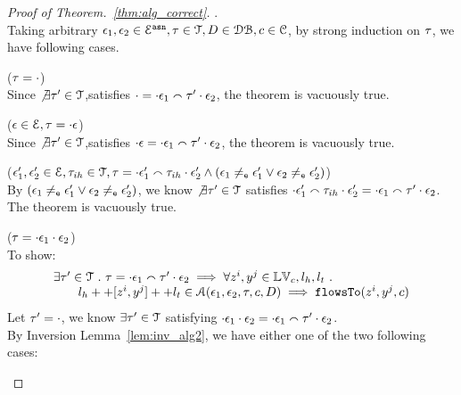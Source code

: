 \begin{proof}[Proof of Theorem.~\ref{thm:alg_correct}].
\\
Taking arbitrary $\mathtt{\epsilon}_1, \mathtt{\epsilon}_2 \in \mathcal{E}^{\mathtt{{asn}}}, \mathtt{\tau} \in \mathcal{T}, D \in \mathcal{DB} , c \in \mathcal{C}$,
by strong induction on $\mathtt{\tau}$, we have following cases.
\begin{case}($\mathtt{\tau} = \cdot$)
\\
Since $\not\exists \mathtt{\tau}' \in \mathcal{T}$,satisfies $
\cdot  = \cdot {} \mathtt{\epsilon}_1 \smallfrown \mathtt{\tau}' \cdot \mathtt{\epsilon}_2$, the theorem is vacuously true.
\end{case}
%
\begin{case}($\mathtt{\epsilon} \in \mathcal{E}, \mathtt{\tau} = \cdot \mathtt{\epsilon}$)
\\
Since $\not\exists \mathtt{\tau}' \in \mathcal{T}$,satisfies $
\cdot  \mathtt{\epsilon} = \cdot \mathtt{\epsilon}_1 \smallfrown \mathtt{\tau}' \cdot \mathtt{\epsilon}_2$, the theorem is vacuously true.
\end{case}
%
\begin{case}($\mathtt{\epsilon}_1', \mathtt{\epsilon}_2' \in \mathcal{E}, \mathtt{\tau}_{ih} \in \mathcal{T}, 
\mathtt{\tau} = \cdot \mathtt{\epsilon}_1' \smallfrown \mathtt{\tau}_{ih} \cdot \mathtt{\epsilon}_2' \land 
(\mathtt{\epsilon}_1 \neq_{\mathtt{e}} \mathtt{\epsilon}_1' \lor \mathtt{\epsilon}_2 \neq_{\mathtt{e}} \mathtt{\epsilon}_2')$)
\\
By $(\mathtt{\epsilon}_1 \neq_{\mathtt{e}} \mathtt{\epsilon}_1' \lor \mathtt{\epsilon}_2 \neq_{\mathtt{e}} \mathtt{\epsilon}_2')$,
we know $\not\exists \mathtt{\tau}' \in \mathcal{T}$ satisfies $
\cdot \mathtt{\epsilon}_1' \smallfrown \mathtt{\tau}_{ih} \cdot \mathtt{\epsilon}_2' = \cdot \mathtt{\epsilon}_1 \smallfrown \mathtt{\tau}' \cdot \mathtt{\epsilon}_2$.
\\
The theorem is vacuously true.
\end{case}
%
%
\begin{case}
\label{case:alg_correct_base}
($\mathtt{\tau} = \cdot {} \mathtt{\epsilon}_1 \cdot {} \mathtt{\epsilon}_2$)
\\
To show:
\[
\begin{array}{l}
  \exists \mathtt{\tau}' \in \mathcal{T} ~.~ \mathtt{\tau} = \cdot \mathtt{\epsilon}_1 \smallfrown \mathtt{\tau}' \cdot \mathtt{\epsilon}_2
  \implies    
  \forall  z^i, y^j \in \mathbb{LV}_c, l_h, l_t ~.~ 
    \\ \qquad 
    l_h ++ [z^i, y^j] ++ l_t \in \mathcal{A}(\mathtt{\epsilon}_1, \mathtt{\epsilon}_2, \mathtt{\tau}, c, D)
   \implies \mathtt{flowsTo}(z^i, y^j, c)
\end{array}
\]
%
Let $\mathtt{\tau}' = \cdot$, we know $\exists \mathtt{\tau}' \in \mathcal{T}$ satisfying 
$\cdot {} \mathtt{\epsilon}_1  {} \cdot {} \mathtt{\epsilon}_2 = \cdot {} \mathtt{\epsilon}_1 \smallfrown \mathtt{\tau}' \cdot \mathtt{\epsilon}_2$.
\\
By Inversion Lemma~\ref{lem:inv_alg2}, we have either one of the two following cases:

\end{case}
\end{proof}
